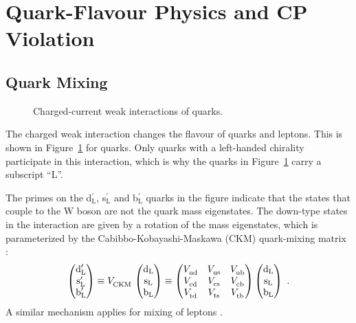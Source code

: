 \section{Quark-Flavour Physics and CP Violation}
\label{sec:intro_CPV}

\subsection{Quark Mixing}
\label{sec:intro_mixCPV_mix}

\begin{figure}[hbt]
  
  \caption{Charged-current weak interactions of quarks.}
  \label{fig:WCouplings}
\end{figure}

The charged weak interaction changes the flavour of quarks and leptons. This is shown in Figure~\ref{fig:WCouplings} for quarks. Only
quarks with a left-handed chirality participate in this interaction, which is why the quarks in Figure~\ref{fig:WCouplings} carry a
subscript ``L''.

The primes on the d$_\text{L}^\prime$, s$_\text{L}^\prime$ and b$_\text{L}^\prime$ quarks in the figure indicate that the states that
couple to the W boson are not the quark mass eigenstates. The down-type states in the interaction are given by a rotation of the mass
eigenstates, which is parameterized by the Cabibbo-Kobayashi-Maskawa (CKM) quark-mixing matrix \cite{Kobayashi:1973fv}:
\begin{equation}
  \begin{pmatrix} \text{d}_\text{L}^\prime \\ \text{s}_\text{L}^\prime \\ \text{b}_\text{L}^\prime \end{pmatrix}
    \equiv \VCKM\, \begin{pmatrix} \text{d}_\text{L} \\ \text{s}_\text{L} \\ \text{b}_\text{L} \end{pmatrix}
    \equiv \begin{pmatrix} \Vud & \Vus & \Vub \\ \Vcd & \Vcs & \Vcb \\ \Vtd & \Vts & \Vtb \end{pmatrix}
           \begin{pmatrix} \text{d}_\text{L} \\ \text{s}_\text{L} \\ \text{b}_\text{L} \end{pmatrix}
    \ .
\end{equation}
A similar mechanism applies for mixing of leptons \cite{Pontecorvo:1957cp,*Pontecorvo:1957qd,*Maki:1962mu,*Pontecorvo:1967fh}.

